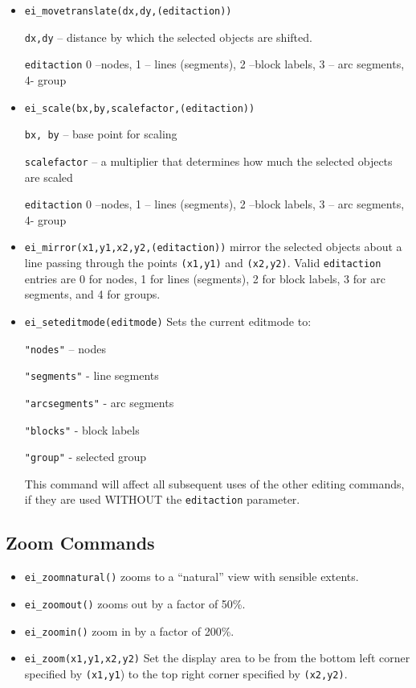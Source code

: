 \begin{itemize}
\item \texttt{ei\_movetranslate(dx,dy,(editaction))}

\texttt{dx,dy} -- distance by which the selected objects are shifted.

\texttt{editaction} 0 --nodes, 1 -- lines (segments), 2 --block labels, 3 --
arc segments, 4- group

\item \texttt{ei\_scale(bx,by,scalefactor,(editaction))}

\texttt{bx, by} -- base point for scaling

\texttt{scalefactor} -- a multiplier that determines how much the selected
objects are scaled

\texttt{editaction} 0 --nodes, 1 -- lines (segments), 2 --block labels, 3 --
arc segments, 4- group

\item \texttt{ei\_mirror(x1,y1,x2,y2,(editaction))} mirror the selected objects about
a line passing through the points \texttt{(x1,y1)} and
\texttt{(x2,y2)}. Valid \texttt{editaction} entries are 0 for
nodes, 1 for lines (segments), 2 for block labels, 3 for arc
segments, and 4 for groups.

\item \texttt{ei\_seteditmode(editmode)} Sets the current editmode to:

\texttt{"nodes"} -- nodes

\texttt{"segments"} - line segments

\texttt{"arcsegments"} - arc segments

\texttt{"blocks"} - block labels

\texttt{"group"} - selected group

This command will affect all subsequent uses of the other editing
commands, if they are used WITHOUT the \texttt{editaction}
parameter.
\end{itemize}

\subsection{Zoom Commands}

\begin{itemize}
\item \texttt{ei\_zoomnatural()} zooms to a ``natural'' view with sensible extents.

\item \texttt{ei\_zoomout()} zooms out by a factor of 50{\%}.

\item \texttt{ei\_zoomin()} zoom in by a factor of 200{\%}.

\item \texttt{ei\_zoom(x1,y1,x2,y2)} Set the display area to be from the bottom left
corner specified by \texttt{(x1,y1}) to the top right corner
specified by \texttt{(x2,y2)}.
\end{itemize}

